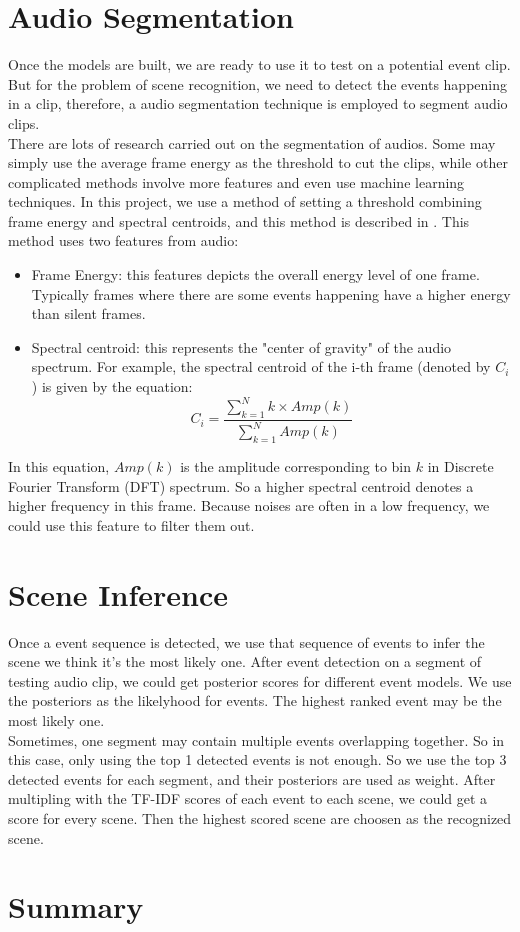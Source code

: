 \section{Audio Segmentation}
Once the models are built, we are ready to use it to test on a potential event clip. 
But for the problem of scene recognition, we need to detect the events happening in a clip, therefore, a audio segmentation technique is employed to segment audio clips. \\ 

There are lots of research carried out on the segmentation of audios.
Some may simply use the average frame energy as the threshold to cut the clips, while other complicated methods involve more features and even use machine learning techniques. 
In this project, we use a method of setting a threshold combining frame energy and spectral centroids, and this method is described in \cite{giannakopoulos2009method}.
This method uses two features from audio:
\begin{itemize}
\item{Frame Energy: this features depicts the overall energy level of one frame. Typically frames where there are some events happening have a higher energy than silent frames.}
\item{Spectral centroid: this represents the "center of gravity" of the audio spectrum. For example, the spectral centroid of the i-th frame (denoted by $ C_i$) is given by the equation:
\[
C_i = \frac{\sum\limits_{k=1}^Nk\times Amp(k)}{\sum\limits_{k=1}^NAmp(k)}
\]
}
\end{itemize}

In this equation, $Amp(k)$ is the amplitude corresponding to bin $k$ in Discrete Fourier Transform (DFT) spectrum. 
So a higher spectral centroid denotes a higher frequency in this frame. Because noises are often in a low frequency, we could use this feature to filter them out. 

\section{Scene Inference}
Once a event sequence is detected, we use that sequence of events to infer the scene we think it's the most likely one. 
After event detection on a segment of testing audio clip, we could get posterior scores for different event models. 
We use the posteriors as the likelyhood for events. The highest ranked event may be the most likely one. \\ 

Sometimes, one segment may contain multiple events overlapping together. 
So in this case, only using the top 1 detected events is not enough. 
So we use the top 3 detected events for each segment, and their posteriors are used as weight. 
After multipling with the TF-IDF scores of each event to each scene, we could get a score for every scene. 
Then the highest scored scene are choosen as the recognized scene. 

\section{Summary}
